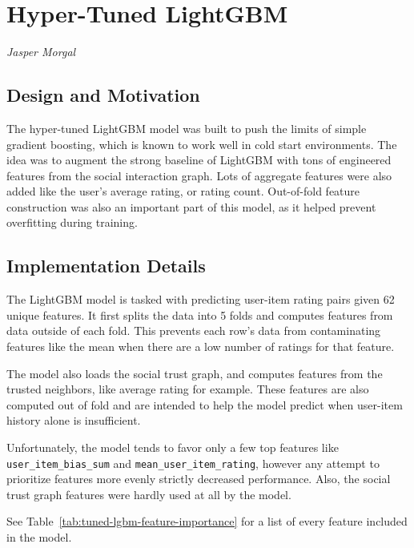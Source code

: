 \documentclass[conference]{IEEEtran}
\begin{document}
\section{Hyper-Tuned LightGBM}
\label{sec:tuned-lgbm}

\textit{Jasper Morgal}

\subsection{Design and Motivation}

The hyper-tuned LightGBM model was built to push the limits of simple gradient boosting, which is known to work well in cold start environments. The idea was to augment the strong baseline of LightGBM with tons of engineered features from the social interaction graph. Lots of aggregate features were also added like the user's average rating, or rating count. Out-of-fold feature construction was also an important part of this model, as it helped prevent overfitting during training.

\subsection{Implementation Details}

The LightGBM model is tasked with predicting user-item rating pairs given 62 unique features. It first splits the data into 5 folds and computes features from data outside of each fold. This prevents each row's data from contaminating features like the mean when there are a low number of ratings for that feature.

The model also loads the social trust graph, and computes features from the trusted neighbors, like average rating for example. These features are also computed out of fold and are intended to help the model predict when user-item history alone is insufficient.

Unfortunately, the model tends to favor only a few top features like \texttt{user\_item\_bias\_sum} and \texttt{mean\_user\_item\_rating}, however any attempt to prioritize features more evenly strictly decreased performance. Also, the social trust graph features were hardly used at all by the model.

See Table~\ref{tab:tuned-lgbm-feature-importance} for a list of every feature included in the model.
\end{document}
